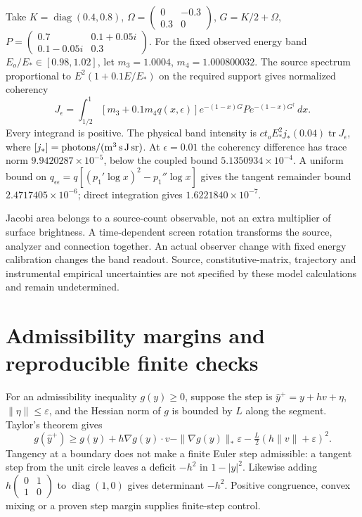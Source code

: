 Take $K=\operatorname{diag}(0.4,0.8)$,
$\Omega=\left(\begin{smallmatrix}0&-0.3\\0.3&0\end{smallmatrix}\right)$,
$G=K/2+\Omega$,
$P=\left(\begin{smallmatrix}0.7&0.1+0.05i\\0.1-0.05i&0.3\end{smallmatrix}\right)$.
For the fixed observed energy band $E_o/E_*\in[0.98,1.02]$, let $m_3=1.0004$, $m_4=1.000800032$. The source spectrum proportional to $E^2(1+0.1E/E_*)$ on the required support gives normalized coherency
\begin{equation}
 J_\epsilon=\int_{1/2}^1[m_3+0.1m_4q(x,\epsilon)]
 e^{-(1-x)G}P e^{-(1-x)G^\dagger}\,dx .
 \label{v:kasner_band}
\end{equation}
Every integrand is positive. The physical band intensity is
$ct_oE_*^2j_*(0.04)\operatorname{tr}J_\epsilon$, where
$[j_*]={\rm photons}/({\rm m^3\,s\,J\,sr})$.
At $\epsilon=0.01$ the coherency difference has trace norm
$9.9420287\times10^{-5}$, below the coupled bound
$5.1350934\times10^{-4}$. A uniform bound on
$q_{\epsilon\epsilon}=q[(p_1'\log x)^2-p_1''\log x]$
gives the tangent remainder bound $2.4717405\times10^{-6}$;
direct integration gives $1.6221840\times10^{-7}$.

Jacobi area belongs to a source-count observable, not an extra multiplier of surface brightness. A time-dependent screen rotation transforms the source, analyzer and connection together. An actual observer change with fixed energy calibration changes the band readout. Source, constitutive-matrix, trajectory and instrumental empirical uncertainties are not specified by these model calculations and remain undetermined.

\section{Admissibility margins and reproducible finite checks}
\label{v:checks}

For an admissibility inequality $g(y)\ge0$, suppose the step is
$\widehat y^+=y+hv+\eta$, $\|\eta\|\le\varepsilon$, and the Hessian norm of $g$ is bounded by $L$ along the segment. Taylor's theorem gives
\begin{equation}
 g(\widehat y^+)\ge g(y)+h\nabla g(y)\cdot v
 -\|\nabla g(y)\|_*\varepsilon
 -\tfrac L2(h\|v\|+\varepsilon)^2 .
 \label{v:admissibility_margin}
\end{equation}
Tangency at a boundary does not make a finite Euler step admissible: a tangent step from the unit circle leaves a deficit $-h^2$ in $1-|y|^2$. Likewise adding $h\left(\begin{smallmatrix}0&1\\1&0\end{smallmatrix}\right)$ to $\operatorname{diag}(1,0)$ gives determinant $-h^2$. Positive congruence, convex mixing or a proven step margin supplies finite-step control.

